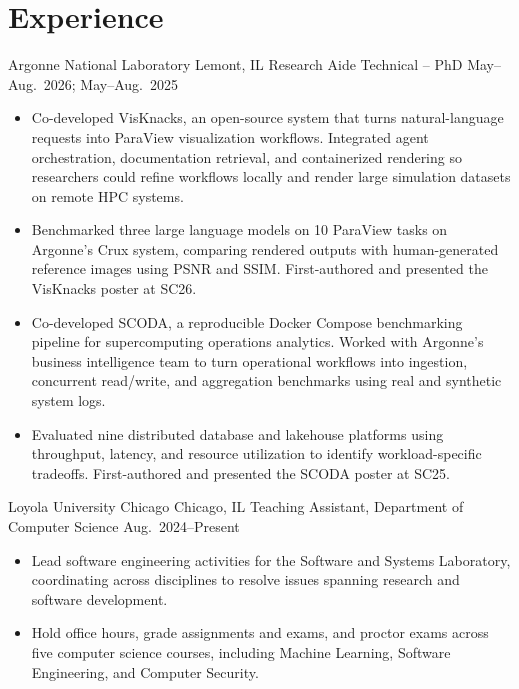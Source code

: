 \section*{Experience}

\cventry
    {Argonne National Laboratory}
    {Lemont, IL}
    {Research Aide Technical -- PhD}
    {May--Aug.\ 2026; May--Aug.\ 2025}

\begin{itemize}
    \item Co-developed VisKnacks, an open-source system that turns
        natural-language requests into ParaView visualization workflows.
        Integrated agent orchestration, documentation retrieval, and
        containerized rendering so researchers could refine workflows
        locally and render large simulation datasets on remote HPC systems.
    \item Benchmarked three large language models on 10 ParaView tasks
        on Argonne's Crux system, comparing rendered outputs with
        human-generated reference images using PSNR and SSIM.
        First-authored and presented the VisKnacks poster at SC26.
    \item Co-developed SCODA, a reproducible Docker Compose benchmarking
        pipeline for supercomputing operations analytics. Worked with
        Argonne's business intelligence team to turn operational workflows
        into ingestion, concurrent read/write, and aggregation benchmarks
        using real and synthetic system logs.
    \item Evaluated nine distributed database and lakehouse platforms
        using throughput, latency, and resource utilization to identify
        workload-specific tradeoffs. First-authored and presented the
        SCODA poster at SC25.
\end{itemize}

\cventry
    {Loyola University Chicago}
    {Chicago, IL}
    {Teaching Assistant, Department of Computer Science}
    {Aug.\ 2024--Present}

\begin{itemize}
    \item Lead software engineering activities for the Software and
        Systems Laboratory, coordinating across disciplines to resolve
        issues spanning research and software development.
    \item Hold office hours, grade assignments and exams, and proctor
        exams across five computer science courses, including Machine
        Learning, Software Engineering, and Computer Security.
\end{itemize}


